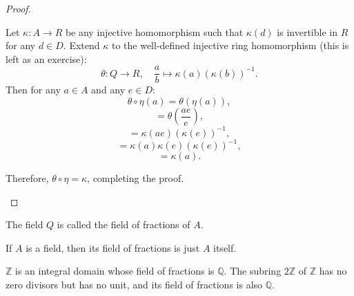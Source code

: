\documentclass[11pt,a4paper]{article}
\begin{document}
\begin{proof}
\begin{enumerate}[label=(\roman*)]
        Let $\kappa : A \to R$ be any injective homomorphism such that $\kappa(d)$ is invertible in $R$ for any $d \in D$. Extend $\kappa$ to the well-defined injective ring homomorphism (this is left as an exercise):
        \[
        \theta : Q \to R, \quad \frac{a}{b} \mapsto \kappa(a)(\kappa(b))^{-1}.
        \]
        Then for any $a \in A$ and any $e \in D$:
        \[
        \theta \circ \eta(a) = \theta(\eta(a)),
        \]
        \[
        = \theta\left(\frac{ae}{e}\right),
        \]
        \[
        = \kappa(ae)(\kappa(e))^{-1},
        \]
        \[
        = \kappa(a)\kappa(e)(\kappa(e))^{-1},
        \]
        \[
        = \kappa(a).
        \]
    
        Therefore, $\theta \circ \eta = \kappa$, completing the proof.
    \end{enumerate}
    \end{proof}
    
    The field $Q$ is called the field of fractions of $A$.
    
    \begin{exa}[9.4]
    If $A$ is a field, then its field of fractions is just $A$ itself.
    \end{exa}
    
    \begin{exa}[9.5]
    $\mathbb{Z}$ is an integral domain whose field of fractions is $\mathbb{Q}$. The subring $2\mathbb{Z}$ of $\mathbb{Z}$ has no zero divisors but has no unit, and its field of fractions is also $\mathbb{Q}$.
    \end{exa}

\vfill{}
\end{document}
